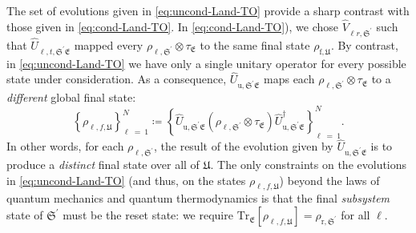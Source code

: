 \documentclass[preprints,article,accept,moreauthors,pdftex]{Definitions/mdpi}
\begin{document}
\begin{paracol}{2}
The set of evolutions given in \eqref{eq:uncond-Land-TO} provide a sharp contrast with those given in \eqref{eq:cond-Land-TO}. In \eqref{eq:cond-Land-TO}), we chose $\widehat{V}_{\ell r,\mathfrak{S}^{\prime}}$ such that $\widehat{U}_{\ell,t,\mathfrak{S^\prime E}}$ mapped every $\rho_{\ell,\mathfrak{S}^{\prime}} \otimes \tau_{\mathfrak{E}}$ to the same final state $\rho_{\mathrm{f},\mathfrak{U}}$. By contrast, in \eqref{eq:uncond-Land-TO} we have only a single unitary operator for every possible state under consideration. As a consequence, $\widehat{U}_{\mathrm{u},\mathfrak{S^\prime E}}$ maps each $\rho_{\ell,\mathfrak{S}^{\prime}} \otimes \tau_{\mathfrak{E}}$ to a \emph{different} global final state:
\begin{equation}
    \label{eq:uncond-Land-final-global-states}
    \left\{\rho_{\ell,f,\mathfrak{U}}\right\}_{\ell\:=\:1}^{N} \coloneqq \left\{\widehat{U}_{\mathrm{u},\mathfrak{S^\prime E}} \left(\rho_{\ell,\mathfrak{S}^{\prime}}\otimes\tau_{\mathfrak{E}}\right)\widehat{U}_{\mathrm{u},\mathfrak{S^\prime E}}^{\dagger}\right\}_{\ell\:=\:1}^{N}.
\end{equation}
In other words, for each $\rho_{\ell,\mathfrak{S}^{\prime}}$, the result of the evolution given by $\widehat{U}_{\mathrm{u},\mathfrak{S^\prime E}}$ is to produce a \emph{distinct} final state over all of $\mathfrak{U}$. The only constraints on the evolutions in \eqref{eq:uncond-Land-TO} (and thus, on the states $\rho_{\ell,f,\mathfrak{U}}$) beyond the laws of quantum mechanics and quantum thermodynamics is that the final \emph{subsystem} state of $\mathfrak{S}^{\prime}$ must be the reset state: we require $\mathrm{Tr}_{\mathfrak{E}}\left[\rho_{\ell,f,\mathfrak{U}}\right] = \rho_{\mathrm{r},\mathfrak{S}^{\prime}}$ for all $\ell$.


\end{paracol}
\end{document}
